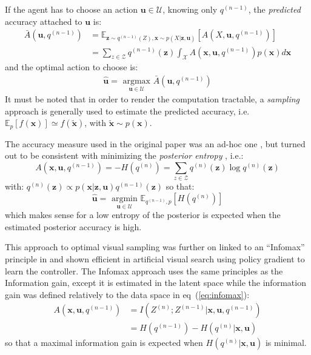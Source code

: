 \documentclass[12pt,twoside,openright]{article}
\begin{document}
If the agent has to choose an action $\boldsymbol{u} \in \mathcal{U}$, knowing only $q^{(n-1)}$, the \emph{predicted} accuracy attached to $\boldsymbol{u}$ is:
\begin{align*}
\bar{A}(\boldsymbol{u}, q^{(n-1)})
&= \mathbb{E}_{\boldsymbol{z} \sim q^{(n-1)}(Z), \boldsymbol{x} \sim p(X|\boldsymbol{z}, \boldsymbol{u})}\left[A(X, \boldsymbol{u}, q^{(n-1)})\right]  \\
&= \sum_{z\in\mathcal{Z}} q^{(n-1)}(\boldsymbol{z}) \int_{\mathcal{X}}  A(\boldsymbol{x}, \boldsymbol{u}, q^{(n-1)}) p(\boldsymbol{x}) d\boldsymbol{x}  
\end{align*}
and the optimal action to choose is:
\begin{align*}
\hat{\boldsymbol{u}} = \underset{\boldsymbol{u} \in \mathcal{U}}{\text{ argmax }} \bar{A}(\boldsymbol{u}, q^{(n-1)})
\end{align*} 
It must be noted that in order to render the computation tractable, a \emph{sampling} approach is generally used to estimate the predicted accuracy, i.e. $\mathbb{E}_p[f(\boldsymbol{x})] \simeq f(\tilde{\boldsymbol{x}})$, with $\tilde{\boldsymbol{x}}\sim p(\boldsymbol{x})$.

The accuracy measure used in the original paper was an ad-hoc one \cite{najemnik2005optimal}, but turned out to be consistent with minimizing the \emph{posterior entropy} \cite{najemnik2009simple}, i.e.:
$$A(\boldsymbol{x}, \boldsymbol{u}, q^{(n-1)}) = -H(q^{(n)}) = \sum_{z \in \mathcal{Z}} q^{(n)}(\boldsymbol{z}) \log q^{(n)}(\boldsymbol{z})$$
with: $q^{(n)}(\boldsymbol{z}) \propto p(\boldsymbol{x|\boldsymbol{z}, \boldsymbol{u}})q^{(n-1)}(\boldsymbol{z}) $
so that:
$$\hat{\boldsymbol{u}} = \underset{\boldsymbol{u} \in \mathcal{U}}{\text{ argmin }} \mathbb{E}_{q^{(n-1)},p}\left[H(q^{(n)})\right] $$ 
which makes sense for a low entropy of the posterior is expected when the estimated posterior accuracy is high.

This approach to optimal visual sampling was further on linked to an ``Infomax'' principle in \cite{butko2010infomax} and shown efficient in artificial visual search using policy gradient \cite{williams1992simple} to learn the controller. The Infomax approach uses the same principles as the Information gain, except it is estimated in the latent space while the information gain was defined relatively to the data space in eq~(\ref{eq:infomax}):
\begin{align}
A(\boldsymbol{x}, \boldsymbol{u}, q^{(n-1)}) &= I(Z^{(n)}; Z^{(n-1)}|\boldsymbol{x}, \boldsymbol{u}, q^{(n-1)})\nonumber\\
&= H(q^{(n-1)}) - H(q^{(n)}|\boldsymbol{x}, \boldsymbol{u})
\end{align}
so that a maximal information gain is expected when $H(q^{(n)}|\boldsymbol{x}, \boldsymbol{u})$ is minimal.
\end{document}
